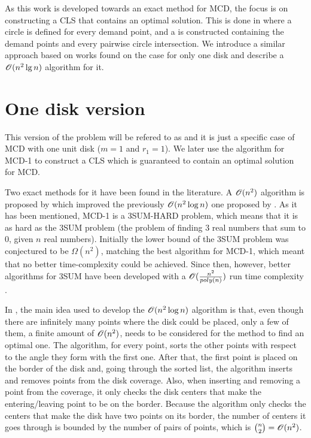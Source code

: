 As this work is developed towards an exact method for MCD, the focus is on constructing a CLS that contains an optimal solution.
This is done in  where a circle is defined for every demand point, and a  is constructed containing the demand points and every pairwise circle intersection.
We introduce a similar approach based on works found on the case for only one disk and describe a $\mathscr{O}(n^2\lg{n})$ algorithm for it.


\section{One disk version}

This version of the problem will be refered to as  and it is just a specific case of MCD with one unit disk ($m=1$ and $r_1=1$). We later use the algorithm for MCD-1 to construct a CLS which is guaranteed to contain an optimal solution for MCD.

Two exact methods for it have been found in the literature. A $\mathscr{O}(n^2)$ algorithm is proposed by  which improved the previously $\mathscr{O}(n^2\log{n})$ one proposed by .
As it has been mentioned, MCD-1 is a 3SUM-HARD problem, which means that it is as hard as the 3SUM problem (the problem of finding $3$ real numbers that sum to $0$, given $n$ real numbers). Initially the lower bound of the 3SUM problem was conjectured to be $\Omega(n^2)$, matching the best algorithm for MCD-1, which meant that no better time-complexity could be achieved. Since then, however, better algorithms for 3SUM have been developed with a $\mathscr{O}(\frac{n^2}{poly(n)})$ run time complexity \cite{3SUM-kopelowitz:2014}.


In , the main idea used to develop the $\mathscr{O}(n^2\log{n})$ algorithm is that, even though there are infinitely many points where the disk could be placed, only a few of them, a finite amount of $\mathscr{O}(n^2)$, needs to be considered for the method to find an optimal one.
The algorithm, for every point, sorts the other points with respect to the angle they form with the first one. After that, the first point is placed on the border of the disk and, going through the sorted list, the algorithm inserts and removes points from the disk coverage. Also, when inserting and removing a point from the coverage, it only checks the disk centers that make the entering/leaving point to be on the border. Because the algorithm only checks the centers that make the disk have two points on its border, the number of centers it goes through is bounded by the number of pairs of points, which is $\binom{n}{2} = \mathscr{O}(n^2)$.

